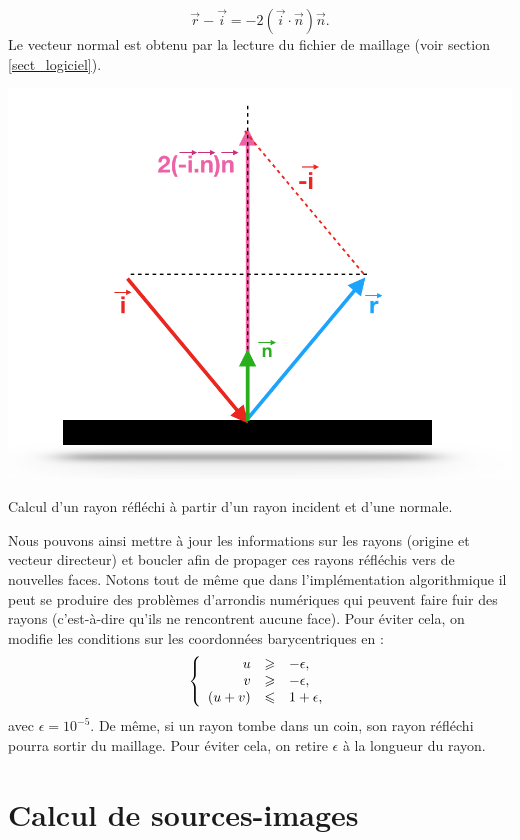 %
\begin{equation}
\overrightarrow{r} - \overrightarrow{i} = -2(\overrightarrow{i}\cdot \overrightarrow{n})\overrightarrow{n}.
\end{equation}
%
Le vecteur normal est obtenu par la lecture du fichier de maillage (voir section \ref{sect_logiciel}).
\begin{figureth}
	\includegraphics[width=0.6\linewidth]{images/rayRefl}
	\caption{Calcul d'un rayon réfléchi à partir d'un rayon incident et d'une normale.}
	\label{rayRefl}
\end{figureth}

Nous pouvons ainsi mettre à jour les informations sur les rayons (origine et vecteur directeur) et boucler afin de propager ces rayons réfléchis vers de nouvelles faces. Notons tout de même que dans l'implémentation algorithmique il peut se produire des problèmes d'arrondis numériques qui peuvent faire fuir des rayons (c'est-à-dire qu'ils ne rencontrent aucune face). Pour éviter cela, on modifie les conditions sur les coordonnées barycentriques en :
\begin{equation}
   \left \{
   \begin{array}{r c l}
u & \geqslant & -\epsilon,  \\
v & \geqslant & -\epsilon,  \\
(u+v) & \leqslant & 1+\epsilon,
   \end{array}
   \right .
\end{equation}
avec $\epsilon = 10^{-5}$. De même, si un rayon tombe dans un coin, son rayon réfléchi pourra sortir du maillage. Pour éviter cela, on retire $\epsilon$ à la longueur du rayon.


\section{Calcul de sources-images} \label{sect_si}


